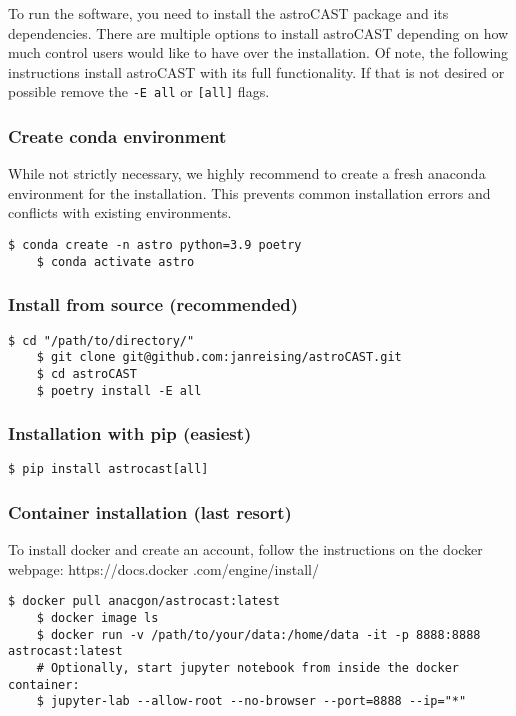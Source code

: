 To run the software, you need to install the astroCAST package and its dependencies. There are multiple options to
install \ac{astroCAST} depending on how much control users would like to have over the installation. Of note, the
following instructions install astroCAST with its full functionality. If that is not desired or possible remove the \lstinline[style=bashStyle]{-E all} or \lstinline[style=bashStyle]{[all]} flags.

\subsubsection{Create conda environment}
While not strictly necessary, we highly recommend to create a fresh anaconda environment for the installation. This
prevents common installation errors and conflicts with existing environments.

\begin{lstlisting}[style=bashStyle]
    $ conda create -n astro python=3.9 poetry
    $ conda activate astro
\end{lstlisting}

\subsubsection{Install from source (recommended)}
\label{res:install-from-source}
\begin{lstlisting}[style=bashStyle]
    $ cd "/path/to/directory/"
    $ git clone git@github.com:janreising/astroCAST.git
    $ cd astroCAST
    $ poetry install -E all
\end{lstlisting}

\subsubsection{Installation with pip (easiest)}
\begin{lstlisting}[style=bashStyle]
    $ pip install astrocast[all]
\end{lstlisting}

\subsubsection{Container installation (last resort)}

To install docker and create an account, follow the instructions on the docker webpage: https://docs.docker
.com/engine/install/

\begin{lstlisting}[style=bashStyle]
    $ docker pull anacgon/astrocast:latest
    $ docker image ls
    $ docker run -v /path/to/your/data:/home/data -it -p 8888:8888 astrocast:latest
    # Optionally, start jupyter notebook from inside the docker container:
    $ jupyter-lab --allow-root --no-browser --port=8888 --ip="*"
\end{lstlisting}

